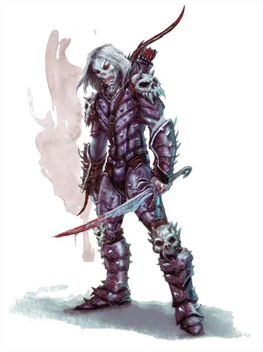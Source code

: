 \documentclass[a4paper,10pt,twoside,twocolumn]{dndbook} %
\begin{document}
	\includegraphics[width=\linewidth]{Wight.png}
	\vfill\pagebreak
\end{document}

